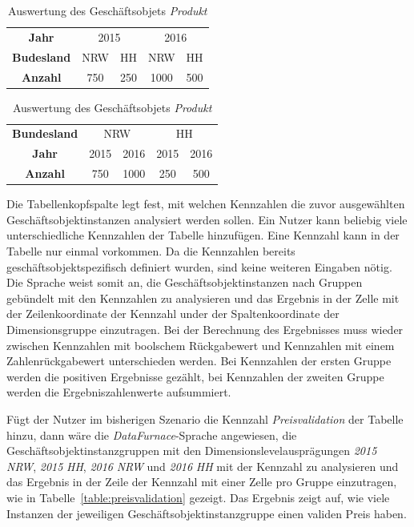 \documentclass[
  language=german, %
  type=bachelor,%
  ngerman
]{isthesis}
\begin{document}
\begin{content}
  \begin{table}
    \footnotesize
    \begin{tabular}{c c c c c}
      \textbf{Jahr} & \multicolumn{2}{c}{2015} & \multicolumn{2}{c}{2016} \\
      \cmidrule(lr){2-3}\cmidrule(lr){4-5}
      \textbf{Budesland} & NRW & HH & NRW & HH \\
      \toprule
      \textbf{Anzahl} & 750 & 250 & 1000 & 500\\
    \end{tabular}
    \begin{tabular}{c c c c c}
      \textbf{Bundesland} & \multicolumn{2}{c}{NRW} & \multicolumn{2}{c}{HH} \\
      \cmidrule(lr){2-3}\cmidrule(lr){4-5}
      \textbf{Jahr} & 2015 & 2016 & 2015 & 2016 \\
      \toprule
      \textbf{Anzahl} & 750 & 1000 & 250 & 500 \\
    \end{tabular}
    \caption{Auswertung des Geschäftsobjets \textit{Produkt}}\label{table:auftrittsreihenfolge}
  \end{table}

  Die Tabellenkopfspalte legt fest, mit welchen Kennzahlen die zuvor
  ausgewählten Geschäftsobjektinstanzen analysiert werden sollen. Ein Nutzer
  kann beliebig viele unterschiedliche Kennzahlen der Tabelle hinzufügen. Eine
  Kennzahl kann in der Tabelle nur einmal vorkommen. Da die Kennzahlen bereits
  geschäftsobjektspezifisch definiert wurden, sind keine weiteren Eingaben
  nötig. Die Sprache weist somit an, die Geschäftsobjektinstanzen nach Gruppen
  gebündelt mit den Kennzahlen zu analysieren und das Ergebnis in der Zelle mit
  der Zeilenkoordinate der Kennzahl under der Spaltenkoordinate der
  Dimensionsgruppe einzutragen. Bei der Berechnung des Ergebnisses muss wieder
  zwischen Kennzahlen mit boolschem Rückgabewert und Kennzahlen mit einem
  Zahlenrückgabewert unterschieden werden. Bei Kennzahlen der ersten
  Gruppe werden die positiven Ergebnisse gezählt, bei Kennzahlen der zweiten
  Gruppe werden die Ergebniszahlenwerte aufsummiert.
  
	Fügt der Nutzer im bisherigen Szenario die Kennzahl \textit{Preisvalidation}
	der Tabelle hinzu, dann wäre die \textit{DataFurnace}-Sprache angewiesen, die
	Geschäftsobjektinstanzgruppen mit den Dimensionslevelausprägungen
	\textit{2015} \textit{NRW}, \textit{2015} \textit{HH}, \textit{2016}
	\textit{NRW} und \textit{2016} \textit{HH} mit der Kennzahl zu analysieren
	und das Ergebnis in der Zeile der Kennzahl mit einer Zelle pro Gruppe
	einzutragen, wie in Tabelle~\ref{table:preisvalidation} gezeigt. Das Ergebnis
	zeigt auf, wie viele Instanzen der jeweiligen Geschäftsobjektinstanzgruppe
	einen validen Preis haben.


\end{content}
\end{document}
